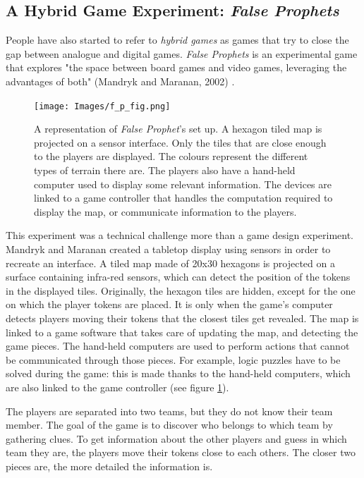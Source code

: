 \subsection{A Hybrid Game Experiment: \textit{False Prophets}}
People have also started to refer to \textit{hybrid games} as games that try to close the gap between analogue and digital games. \textit{False Prophets} is an experimental game that explores "the space between board games and video games, leveraging the advantages of both" (Mandryk and Maranan, 2002) \cite{art:prophets}. 

\begin{figure}[!ht]
    \centering
    \texttt{[image: Images/f\_p\_fig.png]}
    \caption{A representation of \textit{False Prophet}'s set up. A hexagon tiled map is projected on a sensor interface. Only the tiles that are close enough to the players are displayed. The colours represent the different types of terrain there are. The players also have a hand-held computer used to display some relevant information. The devices are linked to a game controller that handles the computation required to display the map, or communicate information to the players.}
    \label{fig:falseprophet}
\end{figure}

This experiment was a technical challenge more than a game design experiment. Mandryk and Maranan created a tabletop display using sensors in order to recreate an interface. A tiled map made of 20x30 hexagons is projected on a surface containing infra-red sensors, which can detect the position of the tokens in the displayed tiles. Originally, the hexagon tiles are hidden, except for the one on which the player tokens are placed. It is only when the game's computer detects players moving their tokens that the closest tiles get revealed. The map is linked to a game software that takes care of updating the map, and detecting the game pieces. The hand-held computers are used to perform actions that cannot be communicated through those pieces. For example, logic puzzles have to be solved during the game: this is made thanks to the hand-held computers, which are also linked to the game controller (see figure \ref{fig:falseprophet}). 

The players are separated into two teams, but they do not know their team member. The goal of the game is to discover who belongs to which team by gathering clues. To get information about the other players and guess in which team they are, the players move their tokens close to each others. The closer two pieces are, the more detailed the information is. 

